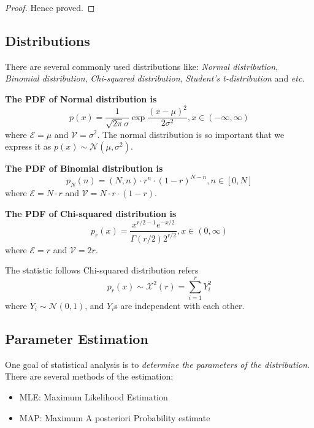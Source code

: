 \documentclass[../main.tex]{subfiles}
\begin{document}
\begin{lemma}
\begin{proof}
        Hence proved.
    \end{proof}


\end{lemma}

\subsection{Distributions}
There are several commonly used distributions like: \emph{Normal distribution}, \emph{Binomial distribution}, \emph{Chi-squared distribution}, \emph{Student's t-distribution} and \textit{etc}.

\bigbreak
\textbf{The PDF of Normal distribution is}
\begin{equation}
    \label{Definition: PDF of Normal distribution}
    p(x)=
    \frac{1}{\sqrt{2\pi}\sigma} \exp{\frac{(x-\mu)^2}{2\sigma^2}},
    x \in (-\infty, \infty)
\end{equation}
where $\mathcal{E}=\mu$ and $\mathcal{V}=\sigma^2$.
The normal distribution is so important that we express it as $p(x) \sim \mathcal{N}(\mu, \sigma^2)$.

\bigbreak
\textbf{The PDF of Binomial distribution is}
\begin{equation}
    \label{Definition: PDF of Binomial distribution}
    p_N(n)=
    (N, n) \cdot r^n \cdot (1-r)^{N-n},
    n \in [0, N]
\end{equation}
where $\mathcal{E}=N \cdot r$ and $\mathcal{V}=N \cdot r \cdot (1-r)$.

\bigbreak
\textbf{The PDF of Chi-squared distribution is}
\begin{equation}
    \label{Definition: PDF of Chi-squared distribution}
    p_r(x)=
    \frac{x^{r/2-1} e^{-x/2}}{\Gamma(r/2) 2^{r/2}},
    x \in (0, \infty)
\end{equation}
where $\mathcal{E}=r$ and $\mathcal{V}=2r$.

The statistic follows Chi-squared distribution refers
\begin{equation*}
    p_r(x) \sim \mathcal{X}^2(r) = \sum_{i=1}^{r} Y_i^2
\end{equation*}
where $Y_i \sim \mathcal{N}(0, 1)$, and $Y_i$s are independent with each other.

\subsection{Parameter Estimation}
One goal of statistical analysis is to \emph{determine the parameters of the distribution}.
There are several methods of the estimation:
\begin{itemize}
    \item MLE: Maximum Likelihood Estimation
    \item MAP: Maximum A posteriori Probability estimate
\end{itemize}
\end{document}
